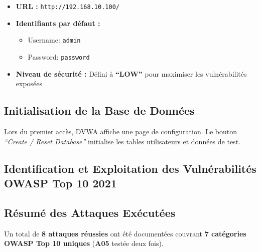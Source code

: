 \documentclass[12pt,a4paper,openany]{report}
\begin{document}
	\begin{itemize}
		\item \textbf{URL :} \texttt{http://192.168.10.100/}
		\item \textbf{Identifiants par défaut :}
		\begin{itemize}
			\item Username: \texttt{admin}
			\item Password: \texttt{password}
		\end{itemize}
		\item \textbf{Niveau de sécurité :} Défini à \textbf{``LOW''} pour maximiser les vulnérabilités exposées
	\end{itemize}
	
	\subsection{Initialisation de la Base de Données}
	
	Lors du premier accès, DVWA affiche une page de configuration. Le bouton
	\textit{``Create / Reset Database''} initialise les tables utilisateurs et données de test.
	
	
	\subsection{Identification et Exploitation des Vulnérabilités OWASP Top 10 2021}
	
	\subsection{Résumé des Attaques Exécutées}
	
	Un total de \textbf{8 attaques réussies} ont été documentées couvrant \textbf{7 catégories OWASP Top 10 uniques} (\textbf{A05} testée deux fois).
	
\end{document}
